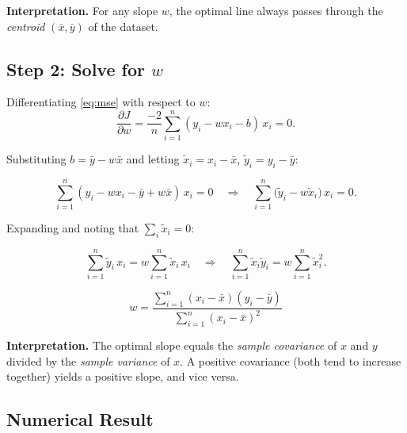 \documentclass[12pt, a4paper]{article}
\newif\ifstudentmode
\newcommand{\sol}[2][6cm]{%
  \ifstudentmode
    \underline{\hspace{#1}}%
  \else
    {#2}%
  \fi
}
\theoremstyle{definition}
\newcommand{\xbar}{\bar{x}}
\newcommand{\ybar}{\bar{y}}
\begin{document}
\begin{notebox}
\textbf{Interpretation.} For any slope $w$, the optimal line always passes
through the \emph{centroid} $(\xbar, \ybar)$ of the dataset.
\end{notebox}

\subsection{Step 2: Solve for \texorpdfstring{$w$}{w}}

Differentiating \eqref{eq:mse} with respect to $w$:
\[
  \frac{\partial J}{\partial w}
  = \frac{-2}{n}\sum_{i=1}^{n}(y_i - wx_i - b)\,x_i = 0.
\]

Substituting $b = \ybar - w\xbar$ and letting $\tilde{x}_i = x_i - \xbar$,
$\tilde{y}_i = y_i - \ybar$:

\[
  \sum_{i=1}^{n}(y_i - wx_i - \ybar + w\xbar)\,x_i = 0
  \quad\Longrightarrow\quad
  \sum_{i=1}^{n}\bigl(\tilde{y}_i - w\tilde{x}_i\bigr)\,x_i = 0.
\]

Expanding and noting that $\sum_i \tilde{x}_i = 0$:

\[
  \sum_{i=1}^{n}\tilde{y}_i\, x_i = w\sum_{i=1}^{n}\tilde{x}_i\, x_i
  \quad\Longrightarrow\quad
  \sum_{i=1}^{n}\tilde{x}_i\tilde{y}_i = w\sum_{i=1}^{n}\tilde{x}_i^2.
\]

\begin{resultbox}
\[
  w = \sol[8cm]{\frac{\displaystyle\sum_{i=1}^{n}(x_i - \xbar)(y_i - \ybar)}
                     {\displaystyle\sum_{i=1}^{n}(x_i - \xbar)^2}}
\]
\end{resultbox}

\begin{notebox}
\textbf{Interpretation.} The optimal slope equals the \emph{sample covariance}
of $x$ and $y$ divided by the \emph{sample variance} of $x$.
A positive covariance (both tend to increase together) yields a positive slope,
and vice versa.
\end{notebox}

\subsection{Numerical Result}
\end{document}
